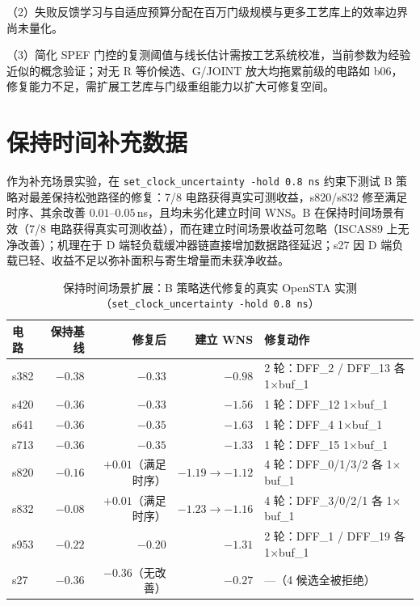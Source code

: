 \documentclass[twocolumn,10pt]{ctexart}
\begin{document}
（2）失败反馈学习与自适应预算分配在百万门级规模与更多工艺库上的效率边界尚未量化。

（3）简化 SPEF 门控的复测阈值与线长估计需按工艺系统校准，当前参数为经验近似的概念验证；对无 R 等价候选、G/JOINT 放大均拖累前级的电路如 b06，修复能力不足，需扩展工艺库与门级重组能力以扩大可修复空间。




\appendix
\section{保持时间补充数据}\label{app:hold}

作为补充场景实验，在 \texttt{set\_clock\_uncertainty -hold 0.8\,ns} 约束下测试 B 策略对最差保持松弛路径的修复：7/8 电路获得真实可测收益，s820/s832 修至满足时序、其余改善 $0.01$--$0.05\,$ns，且均未劣化建立时间 WNS。B 在保持时间场景有效（7/8 电路获得真实可测收益），而在建立时间场景收益可忽略（ISCAS89 上无净改善）；机理在于 D 端轻负载缓冲器链直接增加数据路径延迟；s27 因 D 端负载已轻、收益不足以弥补面积与寄生增量而未获净收益。

\begin{table}[H]
\centering
\caption{保持时间场景扩展：B 策略迭代修复的真实 OpenSTA 实测（\texttt{set\_clock\_uncertainty -hold 0.8\,ns}）}
\label{tab:hold}
\scriptsize
\setlength{\tabcolsep}{1pt}
\begin{tabular}{lrrrp{1.8cm}}
\toprule
\textbf{电路} & \textbf{保持基线} & \textbf{修复后} & \textbf{建立 WNS} & \textbf{修复动作} \\
\midrule
s382 & $-0.38$ & $-0.33$ & $-0.98$ & 2 轮：DFF\_2 / DFF\_13 各 1$\times$buf\_1 \\
s420 & $-0.36$ & $-0.33$ & $-1.56$ & 1 轮：DFF\_12 1$\times$buf\_1 \\
s641 & $-0.36$ & $-0.35$ & $-1.63$ & 1 轮：DFF\_4 1$\times$buf\_1 \\
s713 & $-0.36$ & $-0.35$ & $-1.33$ & 1 轮：DFF\_15 1$\times$buf\_1 \\
s820 & $-0.16$ & $+0.01$（满足时序） & $-1.19\rightarrow -1.12$ & 4 轮：DFF\_0/1/3/2 各 1$\times$buf\_1 \\
s832 & $-0.08$ & $+0.01$（满足时序） & $-1.23\rightarrow -1.16$ & 4 轮：DFF\_3/0/2/1 各 1$\times$buf\_1 \\
s953 & $-0.22$ & $-0.20$ & $-1.31$ & 2 轮：DFF\_1 / DFF\_19 各 1$\times$buf\_1 \\
s27 & $-0.36$ & $-0.36$（无改善） & $-0.27$ & ---（4 候选全被拒绝） \\
\bottomrule
\end{tabular}
\end{table}
\end{document}
